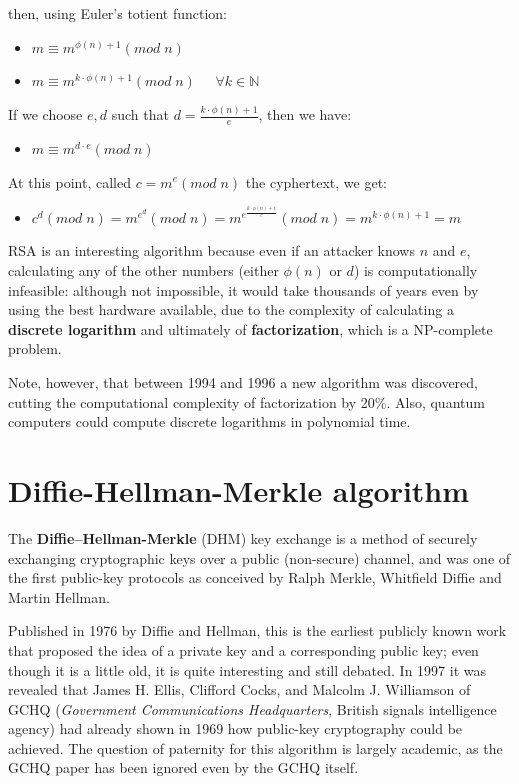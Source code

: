 then, using Euler's totient function:

\begin{itemize}
    \item[] $m \equiv m^{\phi(n)+1}(mod\; n)$
    \item[] $m \equiv m^{k\cdot\phi(n)+1} (mod\; n) \;\;\;\;\; \forall k \in \mathbb{N}$
\end{itemize}

If we choose $e, d$ such that $d = \frac{k\cdot\phi(n)+1}{e}$, then we have:

\begin{itemize}
    \item[] $m \equiv m^{d \cdot e} (mod\; n)$
\end{itemize}

At this point, called $c = m^e (mod\; n)$ the cyphertext, we get:

\begin{itemize}
    \item[] $c^d (mod\; n) = m^{e^d} (mod\; n) = m^{e^{\frac{k\cdot\phi(n)+1}{e}}} (mod\; n) = m^{k\cdot\phi(n)+1} = m$
\end{itemize}

RSA is an interesting algorithm because even if an attacker knows $n$ and $e$, calculating any of the other numbers (either $\phi(n)$ or $d$) is computationally infeasible: although not impossible, it would take thousands of years even by using the best hardware available, due to the complexity of calculating a \textbf{discrete logarithm} and ultimately of \textbf{factorization}, which is a NP-complete problem.

Note, however, that between 1994 and 1996 a new algorithm was discovered, cutting the computational complexity of factorization by 20\%. Also, quantum computers could compute discrete logarithms in polynomial time.


\section{Diffie-Hellman-Merkle algorithm}
The \textbf{Diffie–Hellman-Merkle} (DHM) key exchange is a method of securely exchanging cryptographic keys over a public (non-secure) channel, and was one of the first public-key protocols as conceived by Ralph Merkle, Whitfield Diffie and Martin Hellman.

Published in 1976 by Diffie and Hellman, this is the earliest publicly known work that proposed the idea of a private key and a corresponding public key; even though it is a little old, it is quite interesting and still debated. In 1997 it was revealed that James H. Ellis, Clifford Cocks, and Malcolm J. Williamson of GCHQ (\textit{Government Communications Headquarters}, British signals intelligence agency) had already shown in 1969 how public-key cryptography could be achieved. The question of paternity for this algorithm is largely academic, as the GCHQ paper has been ignored even by the GCHQ itself.

